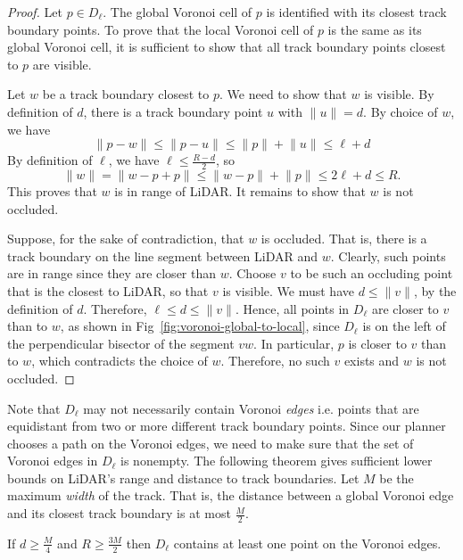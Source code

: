 \begin{proof}
Let $p \in D_\ell$.
%
The global Voronoi cell of $p$ is identified with its closest track boundary points.
%
To prove that the local Voronoi cell of $p$ is the same as its global Voronoi cell, it is sufficient to show that all track boundary points closest to $p$ are visible.


Let $w$ be a track boundary closest to $p$.
%
We need to show that $w$ is visible.
%
By definition of $d$, there is a track boundary point $u$ with $\lVert u \rVert = d$.
%
By choice of $w$, we have
$$
\lVert p - w \rVert 
\leq \lVert p - u \rVert 
\leq \lVert p \rVert + \lVert u \rVert \leq \ell + d
$$
%
By definition of $\ell$, we have $\ell \leq \frac{R-d}{2}$, so
$$
\lVert w \rVert = \lVert w - p + p \rVert \leq \lVert w-p \rVert + \lVert p \rVert \leq 2\ell+d \leq R.
$$
%
This proves that $w$ is in range of LiDAR.
%
It remains to show that $w$ is not occluded.

Suppose, for the sake of contradiction, that $w$ is occluded.
%
That is,
there is a track boundary on the line segment between LiDAR and $w$.
%
Clearly, such points are in range since they are closer than $w$.
%
Choose $v$ to be such an occluding point that is the closest to LiDAR, so that $v$ is visible.
%
We must have $d \leq \lVert v \rVert $, by the definition of $d$.
%
Therefore, $\ell \leq d \leq \lVert v \rVert $.
%
Hence, all points in $D_\ell$ are closer to $v$ than to $w$, as shown in Fig~\ref{fig:voronoi-global-to-local}, since $D_\ell$ is on the left of the perpendicular bisector of the segment $vw$. 
%
In particular, $p$ is closer to $v$ than to $w$, which contradicts the choice of $w$.
%
Therefore, no such $v$ exists and $w$ is not occluded.
\end{proof}

Note that $D_\ell$ may not necessarily contain Voronoi \emph{edges} i.e. points that are equidistant from two or more different track boundary points.
%
Since our planner chooses a path on the Voronoi edges, we need to make sure that the set of Voronoi edges in $D_\ell$ is nonempty.
%
The following theorem gives sufficient lower bounds on LiDAR's range and distance to track boundaries.
%
Let $M$ be the maximum \emph{width} of the track.
%
That is, the distance between a global Voronoi edge and its closest track boundary is at most $\frac{M}{2}$.

\begin{theorem}
If $d \geq \frac{M}{4}$ and $R \geq \frac{3M}{2}$ then $D_\ell$ contains at least one point on the Voronoi edges.
\end{theorem}

